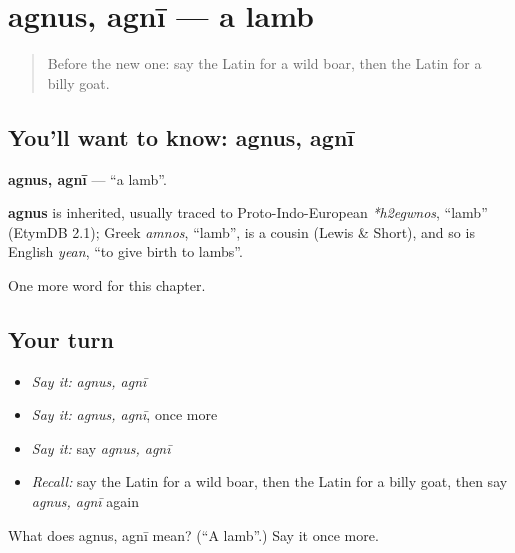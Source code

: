 \section[agnus, agnī]{agnus, agnī — a lamb}

\label{lesson:LA-C224-agnus}



\begin{quote}
Before the new one: say the Latin for a wild boar, then the Latin for a billy goat.
\end{quote}

\subsection*{You'll want to know: agnus, agnī}
\textbf{agnus, agnī} — \textquotedblleft{}a lamb\textquotedblright{}.

\begin{cousinweb}
\textbf{agnus} is inherited, usually traced to Proto-Indo-European \emph{*h2egwnos}, \textquotedblleft{}lamb\textquotedblright{} (EtymDB 2.1); Greek \emph{amnos}, \textquotedblleft{}lamb\textquotedblright{}, is a cousin (Lewis \& Short), and so is English \emph{yean}, \textquotedblleft{}to give birth to lambs\textquotedblright{}.
\end{cousinweb}

\begin{grammarlens}[title={What you've built}]
One more word for this chapter.
\end{grammarlens}

\subsection*{Your turn}
\begin{itemize}
\raggedright
  \item \emph{Say it:} \emph{agnus, agnī}
  \item \emph{Say it:} \emph{agnus, agnī}, once more
  \item \emph{Say it:} say \emph{agnus, agnī}
  \item \emph{Recall:} say the Latin for a wild boar, then the Latin for a billy goat, then say \emph{agnus, agnī} again
\end{itemize}

\begin{tcolorbox}[breakable,colback=teal!4,colframe=teal!35!black,title={Before you move on}]
What does agnus, agnī mean? (\textquotedblleft{}A lamb\textquotedblright{}.) Say it once more.
\end{tcolorbox}
